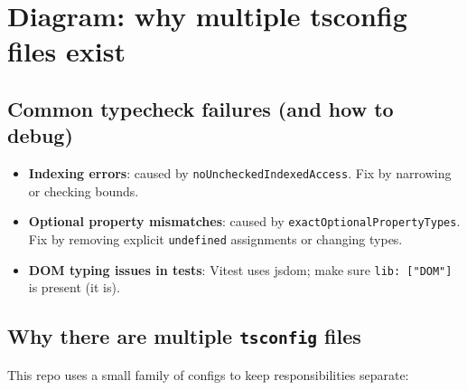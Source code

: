 \section*{Diagram: why multiple tsconfig files exist}
\begin{center}
\end{center}

\subsection{Common typecheck failures (and how to debug)}

\begin{itemize}
\item \textbf{Indexing errors}: caused by \texttt{noUncheckedIndexedAccess}. Fix by narrowing or checking bounds.
\item \textbf{Optional property mismatches}: caused by \texttt{exactOptionalPropertyTypes}. Fix by removing explicit \texttt{undefined} assignments or changing types.
\item \textbf{DOM typing issues in tests}: Vitest uses jsdom; make sure \texttt{lib: ["DOM"]} is present (it is).
\end{itemize}

\subsection{Why there are multiple \texttt{tsconfig} files}

This repo uses a small family of configs to keep responsibilities separate:

